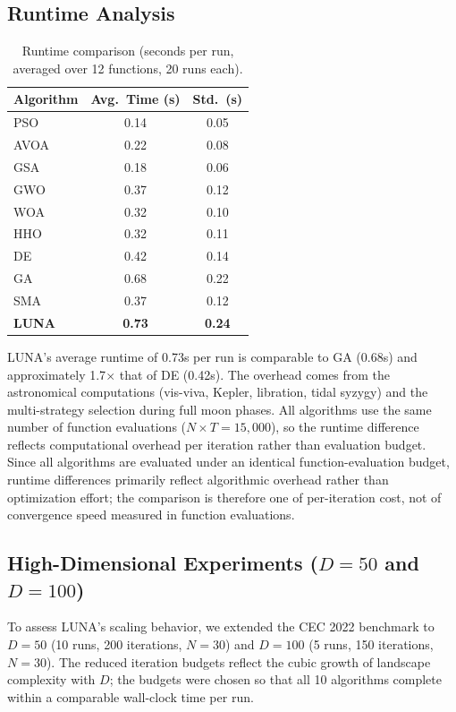 \documentclass[review]{elsarticle}
\theoremstyle{definition}
\begin{document}
\subsection{Runtime Analysis}

\begin{table}[htbp]
\centering
\caption{Runtime comparison (seconds per run, averaged over 12 functions, 20 runs each).}
\label{tab:runtime}
\begin{tabular}{lcc}
\toprule
\textbf{Algorithm} & \textbf{Avg.\ Time (s)} & \textbf{Std.\ (s)} \\
\midrule
PSO & 0.14 & 0.05 \\
AVOA & 0.22 & 0.08 \\
GSA & 0.18 & 0.06 \\
GWO & 0.37 & 0.12 \\
WOA & 0.32 & 0.10 \\
HHO & 0.32 & 0.11 \\
DE & 0.42 & 0.14 \\
GA & 0.68 & 0.22 \\
SMA & 0.37 & 0.12 \\
\textbf{LUNA} & \textbf{0.73} & \textbf{0.24} \\
\bottomrule
\end{tabular}
\end{table}

LUNA's average runtime of 0.73s per run is comparable to GA (0.68s) and approximately 1.7$\times$ that of DE (0.42s). The overhead comes from the astronomical computations (vis-viva, Kepler, libration, tidal syzygy) and the multi-strategy selection during full moon phases. All algorithms use the same number of function evaluations ($N \times T = 15{,}000$), so the runtime difference reflects computational overhead per iteration rather than evaluation budget. Since all algorithms are evaluated under an identical function-evaluation budget, runtime differences primarily reflect algorithmic overhead rather than optimization effort; the comparison is therefore one of per-iteration cost, not of convergence speed measured in function evaluations.

\subsection{High-Dimensional Experiments ($D=50$ and $D=100$)}
\label{sec:high-dim}

To assess LUNA's scaling behavior, we extended the CEC 2022 benchmark to $D=50$ (10 runs, 200 iterations, $N=30$) and $D=100$ (5 runs, 150 iterations, $N=30$). The reduced iteration budgets reflect the cubic growth of landscape complexity with $D$; the budgets were chosen so that all 10 algorithms complete within a comparable wall-clock time per run.
\end{document}
